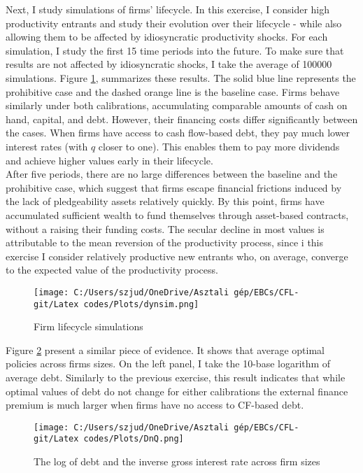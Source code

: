 \documentclass[12pt]{article}
\begin{document}
\noindent Next, I study simulations of firms' lifecycle. In this exercise, I consider high productivity entrants and study their evolution over their lifecycle - while also allowing them to be affected by idiosyncratic productivity shocks. For each simulation, I study the first 15 time periods into the future. To make sure that results are not affected by idiosyncratic shocks, I take the average of 100000 simulations. Figure \ref{chart:dynsim}, summarizes these results. The solid blue line represents the prohibitive case and the dashed orange line is the baseline case. Firms behave similarly under both calibrations, accumulating comparable amounts of cash on hand, capital, and debt. However, their financing costs differ significantly between the cases. When firms have access to cash flow-based debt, they pay much lower interest rates (with $q$ closer to one). This enables them to pay more dividends and achieve higher values early in their lifecycle. \vspace{3mm} \\
After five periods, there are no large differences between the baseline and the prohibitive case, which suggest that firms escape financial frictions induced by the lack of pledgeability assets relatively quickly. By this point, firms have accumulated sufficient wealth to fund themselves through asset-based contracts, without a raising their funding costs. The secular decline in most values is attributable to the mean reversion of the productivity process, since i this exercise I consider relatively productive new entrants who, on average, converge to the expected value of the productivity process.

\begin{figure}[H]  %
    \centering
    \texttt{[image: C:/Users/szjud/OneDrive/Asztali gép/EBCs/CFL-git/Latex codes/Plots/dynsim.png]}
    \caption{Firm lifecycle simulations} \label{chart:dynsim}
\end{figure}

\noindent Figure \ref{chart:DnQ} present a similar piece of evidence. It shows that average optimal policies across firms sizes. On the left panel, I take the 10-base logarithm of average debt. Similarly to the previous exercise, this result indicates that while optimal values of debt do not change for either calibrations the external finance premium is much larger when firms have no access to CF-based debt. 

\begin{figure}[H]  %
    \centering
    \texttt{[image: C:/Users/szjud/OneDrive/Asztali gép/EBCs/CFL-git/Latex codes/Plots/DnQ.png]}
    \caption{The log of debt and the inverse gross interest rate across firm sizes} \label{chart:DnQ}
\end{figure}
\end{document}
